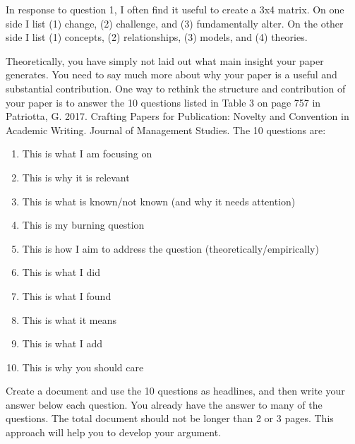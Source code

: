 In response to question 1, I often find it useful to create a 3x4 matrix. On one side I list
(1) change, (2) challenge, and (3) fundamentally alter. On the other side I list (1)
concepts, (2) relationships, (3) models, and (4) theories. 

Theoretically, you have simply not laid out what main insight your paper generates. You
need to say much more about why your paper is a useful and substantial contribution.
One way to rethink the structure and contribution of your paper is to answer the 10
questions listed in Table 3 on page 757 in Patriotta, G. 2017. Crafting Papers for
Publication: Novelty and Convention in Academic Writing. Journal of Management
Studies. The 10 questions are:

\begin{enumerate}
\item This is what I am focusing on
\item This is why it is relevant
\item This is what is known/not known (and why it needs attention)
\item This is my burning question
\item This is how I aim to address the question (theoretically/empirically)
\item This is what I did
\item This is what I found
\item This is what it means
\item This is what I add
\item This is why you should care
\end{enumerate}

Create a document and use the 10 questions as headlines, and then write your answer
below each question. You already have the answer to many of the questions. The total
document should not be longer than 2 or 3 pages. This approach will help you to
develop your argument.


